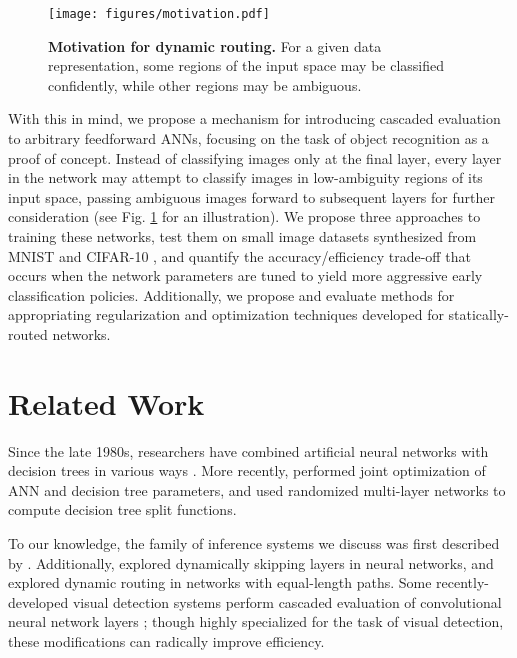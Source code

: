 \documentclass{article}
\begin{document}
  \begin{figure}[htb]
    \centering
    \texttt{[image: figures/motivation.pdf]}
    \caption{\textbf{Motivation for dynamic routing.} For a given data representation, some regions of the input space may be classified confidently, while other regions may be ambiguous.}
    \label{fig:motivation}
  \end{figure}

  With this in mind, we propose a mechanism for introducing cascaded evaluation to arbitrary feedforward ANNs, focusing on the task of object recognition as a proof of concept. Instead of classifying images only at the final layer, every layer in the network may attempt to classify images in low-ambiguity regions of its input space, passing ambiguous images forward to subsequent layers for further consideration (see Fig. \ref*{fig:motivation} for an illustration). We propose three approaches to training these networks, test them on small image datasets synthesized from MNIST \cite{lecun1998mnist} and CIFAR-10 \cite{krizhevsky2009learning}, and quantify the accuracy/efficiency trade-off that occurs when the network parameters are tuned to yield more aggressive early classification policies. Additionally, we propose and evaluate methods for appropriating regularization and optimization techniques developed for statically-routed networks.

  \section{Related Work}
  
  Since the late 1980s, researchers have combined artificial neural networks with decision trees in various ways \cite{utgoff1989perceptron} \cite{sirat1990neural}. More recently, \citet{kontschieder2015deep} performed joint optimization of ANN and decision tree parameters, and \citet{bulo2014neural} used randomized multi-layer networks to compute decision tree split functions.
    
  To our knowledge, the family of inference systems we discuss was first described by \citet{denoyer2014deep}. Additionally, \citet{bengio2015conditional} explored dynamically skipping layers in neural networks, and \citet{ioannou2016decision} explored dynamic routing in networks with equal-length paths. Some recently-developed visual detection systems perform cascaded evaluation of convolutional neural network layers \cite{li2015convolutional,cai2015learning,girshick2015fast,ren2015faster}; though highly specialized for the task of visual detection, these modifications can radically improve efficiency.
  
\end{document}
